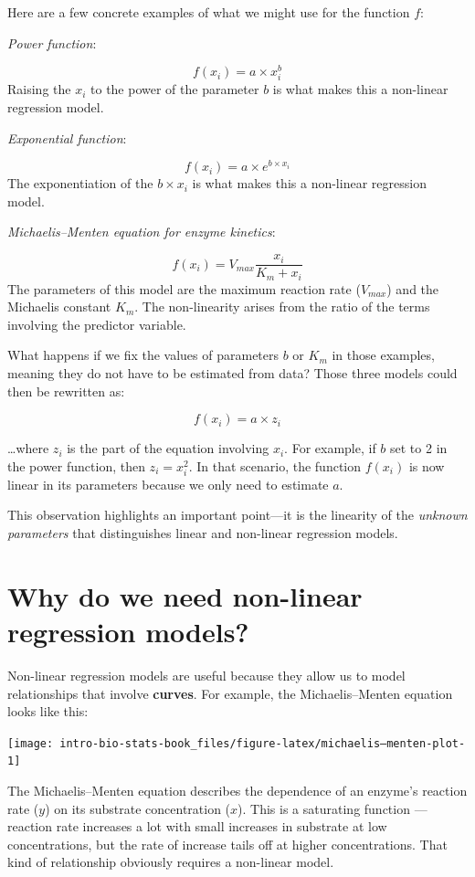 \documentclass[
]{book}
\begin{document}
Here are a few concrete examples of what we might use for the function \(f\):

\emph{Power function}:

\[f(x_i) = a \times x_i^b\]
Raising the \(x_i\) to the power of the parameter \(b\) is what makes this a non-linear regression model.

\emph{Exponential function}:

\[f(x_i) = a \times e^{b \times x_i}\]
The exponentiation of the \(b \times x_i\) is what makes this a non-linear regression model.

\emph{Michaelis--Menten equation for enzyme kinetics}:

\[f(x_i) = V_{max}\frac{x_i}{K_m + x_i}\]
The parameters of this model are the maximum reaction rate (\(V_{max}\)) and the Michaelis constant \(K_m\). The non-linearity arises from the ratio of the terms involving the predictor variable.

What happens if we fix the values of parameters \(b\) or \(K_m\) in those examples, meaning they do not have to be estimated from data? Those three models could then be rewritten as:

\[f(x_i) = a \times z_i\]

\ldots where \(z_i\) is the part of the equation involving \(x_i\). For example, if \(b\) set to 2 in the power function, then \(z_i = x_i^2\). In that scenario, the function \(f(x_i)\) is now linear in its parameters because we only need to estimate \(a\).

This observation highlights an important point---it is the linearity of the \emph{unknown parameters} that distinguishes linear and non-linear regression models.

\hypertarget{why-do-we-need-non-linear-regression-models}{%
\section{Why do we need non-linear regression models?}\label{why-do-we-need-non-linear-regression-models}}

Non-linear regression models are useful because they allow us to model relationships that involve \textbf{curves}. For example, the Michaelis--Menten equation looks like this:

\begin{center}\texttt{[image: intro-bio-stats-book\_files/figure-latex/michaelis–menten-plot-1]} \end{center}

The Michaelis--Menten equation describes the dependence of an enzyme's reaction rate (\(y\)) on its substrate concentration (\(x\)). This is a saturating function --- reaction rate increases a lot with small increases in substrate at low concentrations, but the rate of increase tails off at higher concentrations. That kind of relationship obviously requires a non-linear model.
\end{document}
